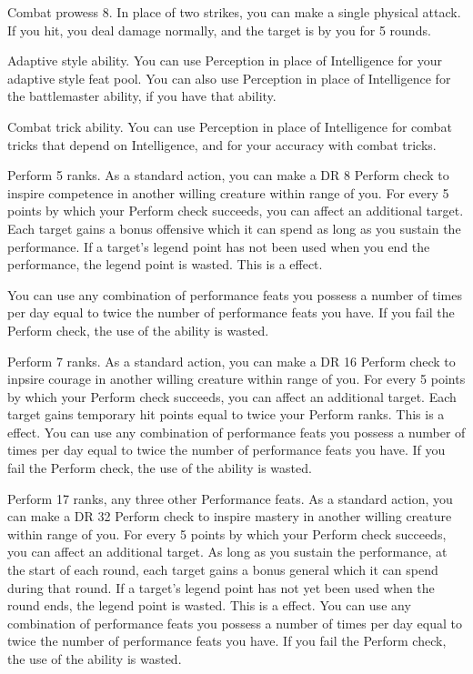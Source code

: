 \featpre Combat prowess 8.
\featben In place of two strikes, you can make a single physical attack.
If you hit, you deal damage normally, and the target is \taunted by you for 5 rounds.

\featpre Adaptive style ability.
\featben You can use Perception in place of Intelligence for your adaptive style feat pool.
You can also use Perception in place of Intelligence for the battlemaster ability, if you have that ability.

\featpre Combat trick ability.
\featben You can use Perception in place of Intelligence for combat tricks that depend on Intelligence, and for your accuracy with combat tricks.

\featpre Perform 5 ranks.
\featben As a standard action, you can make a DR 8 Perform check to inspire competence in another willing creature within \rngmed range of you.
For every 5 points by which your Perform check succeeds, you can affect an additional target.
Each target gains a bonus offensive  which it can spend as long as you sustain the performance.
If a target's legend point has not been used when you end the performance, the legend point is wasted.
This is a  effect.

 You can use any combination of performance feats you possess a number of times per day equal to twice the number of performance feats you have.
If you fail the Perform check, the use of the ability is wasted.

\featpre Perform 7 ranks.
\featben As a standard action, you can make a DR 16 Perform check to inpsire courage in another willing creature within \rngmed range of you.
For every 5 points by which your Perform check succeeds, you can affect an additional target.
Each target gains temporary hit points equal to twice your Perform ranks.
This is a  effect.
 You can use any combination of performance feats you possess a number of times per day equal to twice the number of performance feats you have.
If you fail the Perform check, the use of the ability is wasted.

\featpres Perform 17 ranks, any three other Performance feats.
\featben As a standard action, you can make a DR 32 Perform check to inspire mastery in another willing creature within \rngmed range of you.
For every 5 points by which your Perform check succeeds, you can affect an additional target.
As long as you sustain the performance, at the start of each round, each target gains a bonus general  which it can spend during that round.
If a target's legend point has not yet been used when the round ends, the legend point is wasted.
This is a  effect.
 You can use any combination of performance feats you possess a number of times per day equal to twice the number of performance feats you have.
If you fail the Perform check, the use of the ability is wasted.

